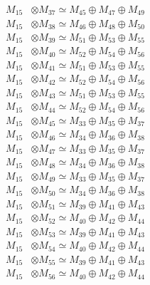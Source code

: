 \begin{align*}
M_{15} &\otimes M_{37} \simeq M_{45} \oplus M_{47} \oplus M_{49} \\
M_{15} &\otimes M_{38} \simeq M_{46} \oplus M_{48} \oplus M_{50} \\
M_{15} &\otimes M_{39} \simeq M_{51} \oplus M_{53} \oplus M_{55} \\
M_{15} &\otimes M_{40} \simeq M_{52} \oplus M_{54} \oplus M_{56} \\
M_{15} &\otimes M_{41} \simeq M_{51} \oplus M_{53} \oplus M_{55} \\
M_{15} &\otimes M_{42} \simeq M_{52} \oplus M_{54} \oplus M_{56} \\
M_{15} &\otimes M_{43} \simeq M_{51} \oplus M_{53} \oplus M_{55} \\
M_{15} &\otimes M_{44} \simeq M_{52} \oplus M_{54} \oplus M_{56} \\
M_{15} &\otimes M_{45} \simeq M_{33} \oplus M_{35} \oplus M_{37} \\
M_{15} &\otimes M_{46} \simeq M_{34} \oplus M_{36} \oplus M_{38} \\
M_{15} &\otimes M_{47} \simeq M_{33} \oplus M_{35} \oplus M_{37} \\
M_{15} &\otimes M_{48} \simeq M_{34} \oplus M_{36} \oplus M_{38} \\
M_{15} &\otimes M_{49} \simeq M_{33} \oplus M_{35} \oplus M_{37} \\
M_{15} &\otimes M_{50} \simeq M_{34} \oplus M_{36} \oplus M_{38} \\
M_{15} &\otimes M_{51} \simeq M_{39} \oplus M_{41} \oplus M_{43} \\
M_{15} &\otimes M_{52} \simeq M_{40} \oplus M_{42} \oplus M_{44} \\
M_{15} &\otimes M_{53} \simeq M_{39} \oplus M_{41} \oplus M_{43} \\
M_{15} &\otimes M_{54} \simeq M_{40} \oplus M_{42} \oplus M_{44} \\
M_{15} &\otimes M_{55} \simeq M_{39} \oplus M_{41} \oplus M_{43} \\
M_{15} &\otimes M_{56} \simeq M_{40} \oplus M_{42} \oplus M_{44} \\
\end{align*}

